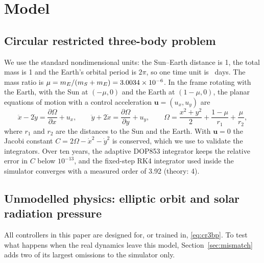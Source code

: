\documentclass[11pt,a4paper]{article}
\begin{document}
\section{Model}

\subsection{Circular restricted three-body problem}

We use the standard nondimensional units: the Sun--Earth distance is 1, the
total mass is 1 and the Earth's orbital period is $2\pi$, so one time unit is
\tuDays~days. The mass ratio is $\mu = m_E/(m_S + m_E) = 3.0034\times10^{-6}$. In the frame
rotating with the Earth, with the Sun at $(-\mu, 0)$ and the Earth at
$(1-\mu, 0)$, the planar equations of motion with a control acceleration
$\mathbf{u} = (u_x, u_y)$ are
\begin{equation}
\ddot{x} - 2\dot{y} = \frac{\partial \Omega}{\partial x} + u_x, \qquad
\ddot{y} + 2\dot{x} = \frac{\partial \Omega}{\partial y} + u_y, \qquad
\Omega = \frac{x^2 + y^2}{2} + \frac{1-\mu}{r_1} + \frac{\mu}{r_2},
\label{eq:cr3bp}
\end{equation}
where $r_1$ and $r_2$ are the distances to the Sun and the Earth. With
$\mathbf{u} = 0$ the Jacobi constant $C = 2\Omega - \dot{x}^2 - \dot{y}^2$ is
conserved, which we use to validate the integrators. Over ten years, the
adaptive DOP853 integrator \cite{hairer1993} keeps the relative error in $C$
below $10^{-13}$, and the fixed-step RK4 integrator used inside the simulator
converges with a measured order of 3.92 (theory: 4).

\subsection{Unmodelled physics: elliptic orbit and solar radiation pressure}
\label{sec:mismatch-model}

All controllers in this paper are designed for, or trained in,
\eqref{eq:cr3bp}. To test what happens when the real dynamics leave this model,
Section~\ref{sec:mismatch} adds two of its largest omissions to the simulator
only.
\end{document}
